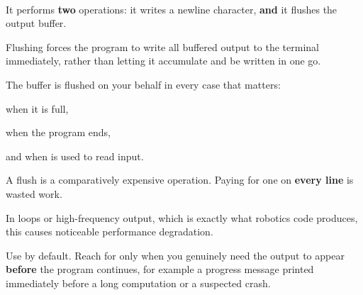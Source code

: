 \documentclass[
    10pt,
    dvipsnames,
    svgnames,
    x11names,
    aspectratio=1610,
    english,
    codeminted]{beamer}
\begin{document}
\begin{frame}[fragile]{\secname}
\framesubtitle{\subsecname}
\begin{compactitem}
\small
    \item It performs \textbf{two} operations: it writes a newline character, \textbf{and} it flushes the output buffer.
    \item Flushing forces the program to write all buffered output to the terminal immediately, rather than letting it accumulate and be written in one go.
\end{compactitem}

\medskip
{}
The buffer is flushed on your behalf in every case that matters:
\begin{compactitem}
\small
    \item when it is full,
    \item when the program ends,
    \item and when  is used to read input.
\end{compactitem}

\medskip
{}
\begin{compactitem}
\small
    \item A flush is a comparatively expensive operation. Paying for one on \textbf{every line} is wasted work.
    \item In loops or high-frequency output, which is exactly what robotics code produces, this causes noticeable performance degradation.
\end{compactitem}

\medskip
\begin{MyBox}
Use  by default. Reach for  only when you genuinely need the output to appear \textbf{before} the program continues, for example a progress message printed immediately before a long computation or a suspected crash.
\end{MyBox}
\end{frame}

\end{document}
